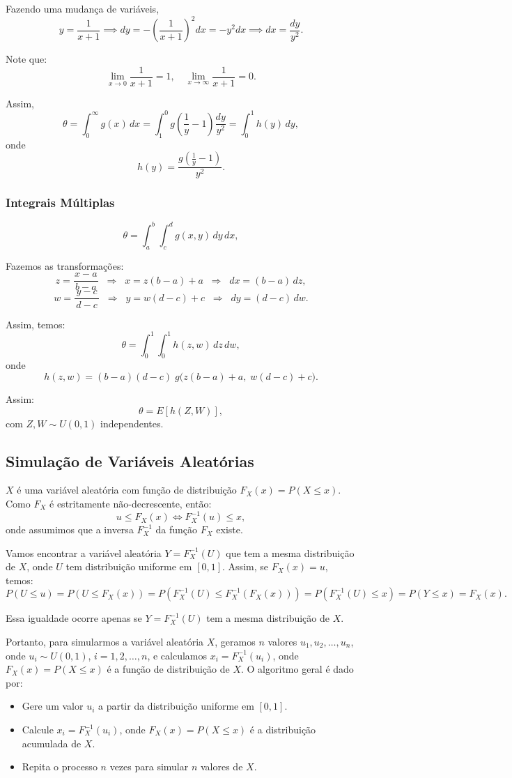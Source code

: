 \documentclass{article}
\begin{document}
Fazendo uma mudança de variáveis,
    $$
    y = \frac{1}{x+1}
    \implies dy = -\left(\frac{1}{x+1}\right)^{2} dx
    = -y^2 dx
    \implies dx = \frac{dy}{y^2}.
    $$

Note que:
    $$
    \lim_{x \to 0} \frac{1}{x+1} = 1, \quad
    \lim_{x \to \infty} \frac{1}{x+1} = 0.
    $$

Assim,
    $$
    \theta = \int_{0}^{\infty} g(x)\, dx
    = \int_{1}^{0} g\left( \frac{1}{y} - 1 \right) \frac{dy}{y^2}
    = \int_{0}^{1} h(y)\, dy,
    $$
    onde
    $$
    h(y) = \frac{g\left( \frac{1}{y} - 1 \right)}{y^2}.
    $$

\subsubsection{Integrais Múltiplas}
    $$
    \theta = \int_{a}^{b}\!\!\int_{c}^{d} g(x,y)\, dy\, dx,
    $$

Fazemos as transformações:
    $$
    z=\frac{x-a}{\,b-a\,} \;\;\Longrightarrow\;\; x = z(b-a)+a \;\;\Longrightarrow\;\; dx=(b-a)\,dz,
    $$
    $$
    w=\frac{y-c}{\,d-c\,} \;\;\Longrightarrow\;\; y = w(d-c)+c \;\;\Longrightarrow\;\; dy=(d-c)\,dw.
    $$
    
Assim, temos:
    $$
    \theta=\int_{0}^{1}\!\!\int_{0}^{1} h(z,w)\, dz\, dw,
    $$
onde
    $$
    h(z,w)=(b-a)(d-c)\; g\!\big(z(b-a)+a,\; w(d-c)+c\big).
    $$

    Assim:
    $$
    \theta = E\!\left[h(Z,W)\right],
    $$
com $Z,W \sim U(0,1)$ independentes.

\subsection{Simulação de Variáveis Aleatórias}
$X$ é uma variável aleatória com função de distribuição $F_X(x) = P(X \le x)$. Como $F_X$ é estritamente não-decrescente, então:
    $$
    u \le F_X(x) \iff F_X^{-1}(u) \le x,
    $$
onde assumimos que a inversa $F_X^{-1}$ da função $F_X$ existe.

Vamos encontrar a variável aleatória $Y = F_X^{-1}(U)$ que tem a mesma distribuição de $X$,
onde $U$ tem distribuição uniforme em $[0,1]$.
Assim, se $F_X(x) = u$, temos:
$$
P(U \le u) = P(U \le F_X(x))
= P(F_X^{-1}(U) \le F_X^{-1}(F_X(x)))
= P(F_X^{-1}(U) \le x) = P(Y \le x) = F_X(x).
$$

Essa igualdade ocorre apenas se $Y = F_X^{-1}(U)$ tem a mesma distribuição de $X$.

Portanto, para simularmos a variável aleatória $X$, geramos $n$ valores $u_1, u_2, \ldots, u_n$, onde $u_i \sim U(0,1)$, $i = 1,2,\ldots,n$, e calculamos $x_i = F_X^{-1}(u_i)$, onde $F_X(x) = P(X \le x)$ é a função de distribuição de $X$. O algoritmo geral é dado por:
\begin{itemize}
    \item Gere um valor $u_i$ a partir da distribuição uniforme em $[0,1]$.
    \item Calcule $x_i = F_X^{-1}(u_i)$, onde $F_X(x) = P(X \le x)$ é a distribuição acumulada de $X$.
    \item Repita o processo $n$ vezes para simular $n$ valores de $X$.
\end{itemize}
\end{document}
